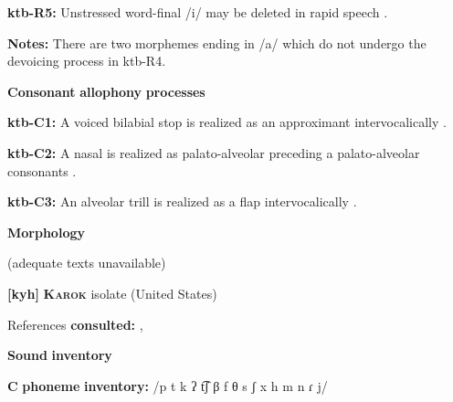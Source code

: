 \documentclass[output=paper]{langsci/langscibook}
\begin{document}
\begin{styleBody}
\textbf{ktb-R5:} Unstressed word-final /i/ may be deleted in rapid speech \citep[20]{Treis2008}.
\end{styleBody}

\begin{styleBody}
\textbf{Notes:} There are two morphemes ending in /a/ which do not undergo the devoicing process in ktb-R4.
\end{styleBody}

\begin{styleBody}
\textbf{Consonant} \textbf{allophony} \textbf{processes}
\end{styleBody}

\begin{styleBody}
\textbf{ktb-C1:} A voiced bilabial stop is realized as an approximant intervocalically \citep[24]{Treis2008}.
\end{styleBody}

\begin{styleBody}
\textbf{ktb-C2:} A nasal is realized as palato-alveolar preceding a palato-alveolar consonants \citep[34]{Treis2008}.
\end{styleBody}

\begin{styleBody}
\textbf{ktb-C3:} An alveolar trill is realized as a flap intervocalically \citep[35]{Treis2008}.
\end{styleBody}

\begin{styleBody}
\textbf{Morphology}
\end{styleBody}

\begin{styleBody}
(adequate texts unavailable)
\end{styleBody}

\begin{styleBody}
\textbf{[kyh]}   \textbf{\textsc{Karok}}  isolate (United States)
\end{styleBody}

\begin{styleBody}
References \textbf{consulted:} \citet{Bright1957}, \citet{Sandy2014}
\end{styleBody}

\begin{styleBody}
\textbf{Sound} \textbf{inventory}
\end{styleBody}

\begin{styleBody}
\textbf{C} \textbf{phoneme} \textbf{inventory:} /p t k ʔ t͡ʃ β f θ s ʃ x h m n ɾ j/
\end{styleBody}
\end{document}
